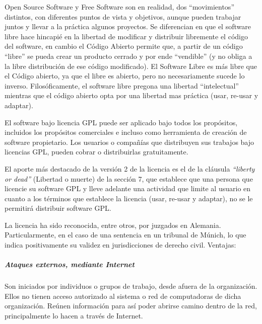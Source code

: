     Open Source Software y Free Software son en realidad, dos ``movimientos'' distintos, con diferentes puntos de vista y objetivos, aunque pueden trabajar juntos y llevar a la práctica algunos proyectos.
    Se diferencian en que el software libre hace hincapié en la libertad de modificar y distribuir libremente el código del software, en cambio el Código Abierto permite que, a partir de un código ``libre'' se pueda crear un producto cerrado y por ende ``vendible'' (y no obliga a la libre distribución de ese código modificado).
    El Software Libre es más libre que el Código abierto, ya que el libre es abierto, pero no necesariamente sucede lo inverso.
    Filosóficamente, el software libre pregona una libertad ``intelectual'' mientras que el código abierto opta por una libertad mas práctica (usar, re-usar y adaptar).
    
	El software bajo licencia GPL puede ser aplicado bajo todos los propósitos, incluidos los propósitos comerciales e incluso como herramienta de creación de software propietario.
    Los usuarios o compañías que distribuyen sus trabajos bajo licencias GPL, pueden cobrar o distribuirlas gratuitamente.
    
    El aporte más destacado de la versión 2 de la licencia es el de la cláusula \textit{``liberty or dead''} (Libertad o muerte) de la sección 7, que establece que una persona que licencie su software GPL y lleve adelante una actividad que limite al usuario en cuanto a los términos que establece la licencia (usar, re-usar y adaptar), no se le permitirá distribuir software GPL.
    
    La licencia ha sido reconocida, entre otros, por juzgados en Alemania.
    Particularmente, en el caso de una sentencia en un tribunal de Múnich, lo que indica positivamente su validez en jurisdicciones de derecho civil.
    Ventajas:


\subparagraph{Ataques externos, mediante Internet}

    Son iniciados por individuos o grupos de trabajo, desde afuera de la organización.
    Ellos no tienen acceso autorizado al sistema o red de computadoras de dicha organización.
    Reúnen información para así poder abrirse camino dentro de la red, principalmente lo hacen a través de Internet.
    
